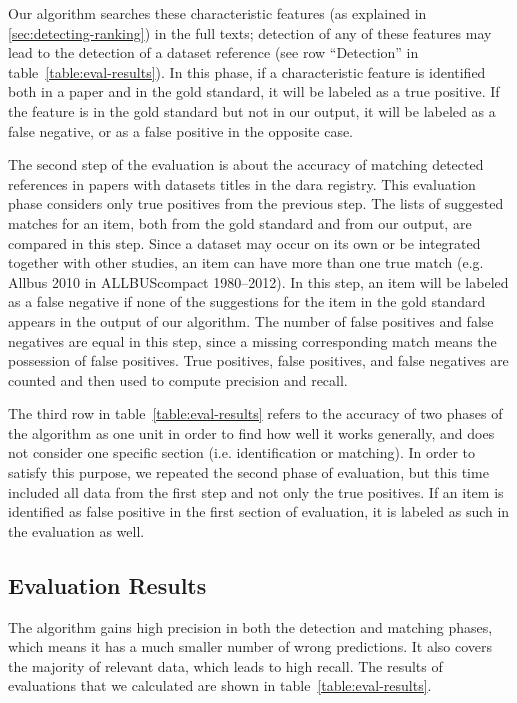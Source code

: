 \documentclass{IOS-Book-Article}
\newcommand{\dara}{\textsf{da\textbar ra}}
\begin{document}
Our algorithm searches these characteristic features (as explained in \ref{sec:detecting-ranking}) in the full texts; detection of any of these features may lead to the detection of a dataset reference (see row \enquote{Detection} in table~\ref{table:eval-results}). In this phase, if a characteristic feature is identified both in a paper and in the gold standard, it will be labeled as a true positive. If the feature is in the gold standard but not in our output, it will be labeled as a false negative, or as a false positive in the opposite case.
 
The second step of the evaluation is about the accuracy of matching detected references in papers with datasets titles in the {\dara} registry. This evaluation phase considers only true positives from the previous step. The lists of suggested matches for an item, both from the gold standard and from our output, are compared in this step. 
Since a dataset may occur on its own or be integrated together with other studies,
an item can have more than one true match (e.g. Allbus 2010 in ALLBUScompact 1980--2012). In this step, an item will be labeled as a false negative if none of the suggestions for the item in the gold standard appears in the output of our algorithm. The number of false positives and false negatives are equal in this step, since a missing corresponding match means the possession of false positives. True positives, false positives, and false negatives are counted and then used to compute precision and recall.

The third row in table~\ref{table:eval-results} refers to the accuracy of two phases of the algorithm as one unit in order to find how well it works generally, and does not consider one specific section (i.e. identification or matching). In order to satisfy this purpose, we repeated the second phase of evaluation, but this time included all data from the first step and not only the true positives. If an item is identified as false positive in the first section of evaluation, it is labeled as such in the evaluation as well.   
 
\subsection{Evaluation Results}
\label{sec:evre}
The algorithm gains high precision in both the detection and matching phases, which means it has a much smaller number of wrong predictions. It also covers the majority of relevant data, which leads to high recall.
The results of evaluations that we calculated are shown in table~\ref{table:eval-results}.
 
\end{document}
